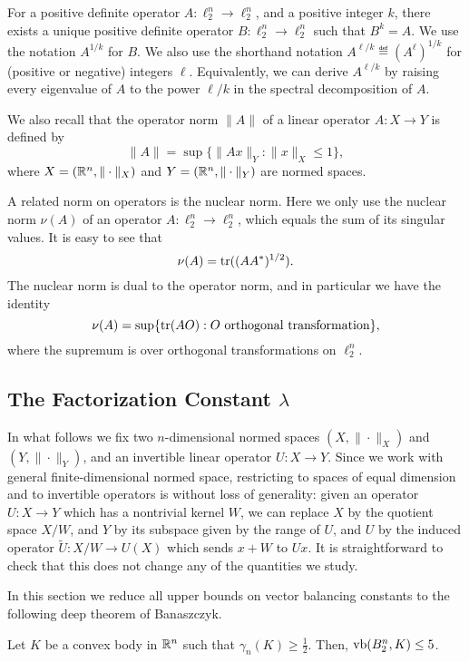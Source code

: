 For a positive definite operator $A:\ell_2^n \to \ell_2^n$, and a
positive integer $k$, there exists a unique positive definite operator
$B:\ell_2^n \to \ell_2^n$ such that $B^k = A$. We use the notation
$A^{1/k}$ for $B$. We also use the shorthand notation $A^{\ell/k} \eqdef
(A^\ell)^{1/k}$ for (positive or negative) integers
$\ell$. Equivalently, we can derive $A^{\ell/k}$ by raising every
eigenvalue of $A$ to the power $\ell/k$ in the spectral decomposition
of $A$.

We also recall that the operator norm $\|A\|$ of a linear operator
$A:X \to Y$ is defined by 
\[
\|A\| = \sup\{\|Ax\|_Y: \|x\|_X \le 1\},
\]
where $X = ({\mathbb{R}}^n, \|\cdot\|_X)$ and $Y = ({\mathbb{R}}^n, \|\cdot\|_Y)$ are
normed spaces. 

A related norm on operators is the nuclear norm. Here we only use the
nuclear norm $\nu(A)$ of an operator $A:\ell_2^n \to \ell_2^n$, which
equals the sum of its singular values. It is easy to see that
\[
\nu(A) = \operatorname{tr}((AA^*)^{1/2}).
\]
The nuclear norm is dual to the operator norm, and in particular we
have the identity
\[
\nu(A) = \sup\{\operatorname{tr}(AO): O \text{ orthogonal transformation}\},
\]
where the supremum is over orthogonal transformations on $\ell_2^n$. 


\subsection{The Factorization Constant $\lambda$}

In what follows we fix two $n$-dimensional normed spaces $(X,
\|\cdot\|_X)$ and $(Y,\|\cdot\|_Y)$, and an invertible linear operator
$U:X \to Y$. Since we work with general finite-dimensional normed
space, restricting to spaces of equal dimension and to invertible
operators is without loss of generality: given an operator $U:X \to Y$
which has a nontrivial kernel $W$, we can replace $X$ by the
quotient space $X/W$, and $Y$ by its subspace given by the range of
$U$, and $U$ by the induced operator $\tilde{U}:X/W \to U(X)$ which
sends $x+W$ to $Ux$. It is straightforward to check that this does not
change any of the quantities we study.

In this section we reduce all upper bounds on vector balancing
constants to the following deep theorem of Banaszczyk.
\begin{theorem}\label{thm:bana}
  Let $K$ be a convex body in ${\mathbb{R}}^n$ such that $\gamma_n(K) \ge
  \frac12$. Then, $\operatorname{vb}(B_2^n, K) \le 5$.
\end{theorem}

